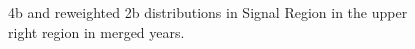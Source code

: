 \begin{figure}[ht]
 
 
    \caption{4b and reweighted 2b distributions in Signal Region in the upper right region in merged years.}
    \label{fig:upper-right-4bvbf-SR-all}
\end{figure}


